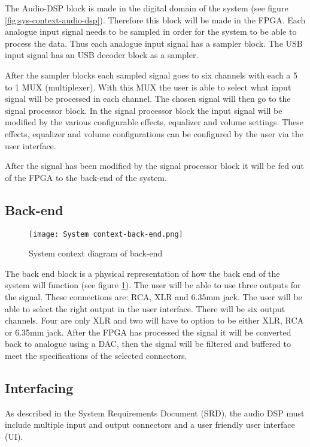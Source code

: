 The Audio-DSP block is made in the digital domain of the system (see figure \ref{fig:sys-context-audio-dsp}). Therefore this block will be made in the FPGA. Each analogue input signal needs to be sampled in order for the system to be able to process the data. Thus each analogue input signal has a sampler block. The USB input signal has an USB decoder block as a sampler. 

After the sampler blocks each sampled signal goes to six channels with each a 5 to 1 MUX (multiplexer). With this MUX the user is able to select what input signal will be processed in each channel. The chosen signal will then go to the signal processor block. In the signal processor block the input signal will be modified by the various configurable effects, equalizer and volume settings. These effects, equalizer and volume configurations can be configured by the user via the user interface.

After the signal has been modified by the signal processor block it will be fed out of the FPGA to the back-end of the system.

\subsection{Back-end}
\begin{figure}[ht]
    \texttt{[image: System context-back-end.png]}
    \caption{System context diagram of back-end}
    \label{fig:system-context-back-end}
\end{figure}

The back end block is a physical representation of how the back end of the system will function (see figure \ref{fig:system-context-back-end}). The user will be able to use three outputs for the signal. These connections are: RCA, XLR and 6.35mm jack. The user will be able to select the right output in the user interface. There will be six output channels. Four are only XLR and two will have to option to be either XLR, RCA or 6.35mm jack. After the FPGA has processed the signal it will be converted back to analogue using a DAC, then the signal will be filtered and buffered to meet the specifications of the selected connectors.

\subsection{Interfacing}
As described in the System Requirements Document (SRD), the audio DSP must include multiple input and output connectors and a user friendly user interface (UI).
